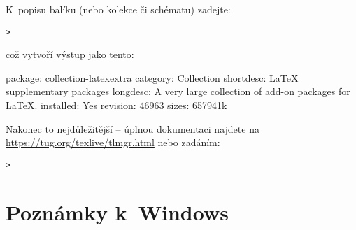 \documentclass[\classoptions,slovak,english,czech]{\classname}
\begin{document}
K~popisu balíku (nebo kolekce či schématu) zadejte:
\begin{alltt}
> 
\end{alltt}
což vytvoří výstup jako tento:
\begin{fverbatim}
package:    collection-latexextra
category:   Collection
shortdesc:  LaTeX supplementary packages
longdesc:   A very large collection of add-on packages for LaTeX.
installed:  Yes
revision:   46963
sizes:      657941k
\end{fverbatim}

Nakonec to nejdůležitější -- úplnou dokumentaci najdete na
\url{https://tug.org/texlive/tlmgr.html} nebo zadáním:
\begin{alltt}
> 
\end{alltt}

\section{Poznámky k~Windows}
\label{sec:windows}
\end{document}
